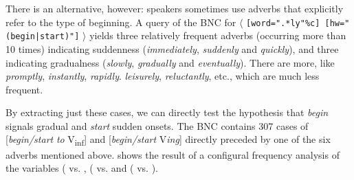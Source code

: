 There is an alternative, however: speakers sometimes use adverbs  that explicitly refer to the type of beginning. A query of the BNC  for $\langle$ \texttt{[word=".*ly"\%c] [hw="(begin|start)"]} $\rangle$ yields three relatively frequent adverbs  (occurring more than 10 times) indicating suddenness (\textit{immediately}, \textit{suddenly} and \textit{quickly}), and three indicating gradualness (\textit{slowly}, \textit{gradually} and \textit{eventually}). There are more, like \textit{promptly}, \textit{instantly}, \textit{rapidly}. \textit{leisurely}, \textit{reluctantly}, etc., which are much less  frequent.

By extracting  just these cases, we can directly test the hypothesis that \textit{begin} signals gradual and \textit{start} sudden onsets. The BNC  contains 307 cases of [\textit{begin\slash start} \textit{to} V\textsubscript{inf}] and [\textit{begin\slash start} V\textit{ing}] directly preceded by one of the six adverbs  mentioned above.  shows the result of a configural  frequency analysis of the variables  ( vs. ,   ( vs.  and  ( vs. ).

